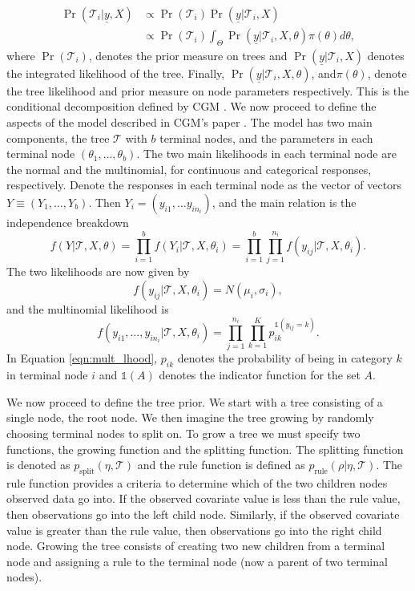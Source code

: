 \documentclass{article}
\newcommand{\yvec}{\underline{y}}
\begin{document}
\begin{align}
 \Pr(\mathcal{T}_i \vert \yvec, X ) &\propto \Pr(\mathcal{T}_i)\Pr(\yvec \vert \mathcal{T}_i, X)\\
  &\propto \Pr(\mathcal{T}_i)\int_{\Theta}\Pr(\yvec \vert \mathcal{T}_i, X, \theta)\pi(\theta)d\theta,
\end{align}
where $\Pr(\mathcal{T}_i)$, denotes the prior measure on trees and $\Pr(\yvec \vert \mathcal{T}_i, X)$ denotes the integrated likelihood of the tree. Finally, $\Pr(\yvec \vert \mathcal{T}_i, X, \theta)$, and$\pi(\theta)$, denote the tree likelihood and prior measure on node parameters respectively. This is the conditional decomposition defined by CGM \cite{chipman1998bayesian}. We now proceed to define the aspects of the model described in CGM's paper \cite{chipman1998bayesian}. 
The model has two main components, the tree $\mathcal{T}$ with $b$ terminal nodes, and the parameters in each terminal node $(\theta_1,\dots,\theta_b)$. 
The two main likelihoods in each terminal node are the normal and the multinomial, for continuous and categorical responses, respectively. 
Denote the responses in each terminal node as the vector  of vectors $Y\equiv (Y_1, \dots, Y_b)$. Then $Y_i = (y_{i1}, \dots y_{in_i})$, and the main relation is the independence breakdown 
\begin{equation}\label{eqn:lhood}
f(Y\vert \mathcal{T}, X, \theta) =\prod_{i=1}^b f(Y_i\vert \mathcal{T}, X, \theta_i) = \prod_{i=1}^b \prod_{j=1}^{n_i} f(y_{ij} \vert \mathcal{T}, X, \theta_i).
\end{equation}
The two likelihoods are now given by
\begin{equation}\label{eqn:normal_tree}
f(y_{ij} \vert \mathcal{T}, X, \theta_i) = N(\mu_i,\sigma_i),
\end{equation}
and the multinomial likelihood is
\begin{equation}\label{eqn:mult_lhood}
f(y_{i1}, \dots ,y_{in_i} \vert \mathcal{T}, X, \theta_i) = \prod_{j=1}^{n_i}\prod_{k=1}^K p_{ik}^{\mathds{1}(y_{ij}=k)}.
\end{equation}
In Equation \ref{eqn:mult_lhood}, $p_{ik}$ denotes the probability of being in category $k$ in terminal node $i$ and $\mathds{1}(A)$ denotes the indicator function for the set $A$. 

We now proceed to define the tree prior. We start with a tree consisting of a single node, the root node. We then imagine the tree growing by randomly choosing terminal nodes to split on. To grow a tree we must specify two functions, the growing function and the splitting function.  The splitting function is denoted as $p_{\text{split}}(\eta, \mathcal{T})$ and the rule function is defined as $p_{\text{rule}}(\rho \vert \eta, \mathcal{T})$. The rule function provides a criteria to determine which of the two children nodes observed data go into. If the observed covariate value is less than the rule value, then observations go into the left child node. Similarly, if the observed covariate value is greater than the rule value, then observations go into the right child node. Growing the tree consists of creating two new children from a terminal node and assigning a rule to the terminal node (now a parent of two terminal nodes). 
\end{document}
